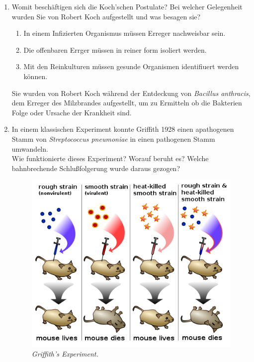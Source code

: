 	\begin{enumerate}
		\item Womit beschäftigen sich die Koch’schen Postulate?
		Bei welcher Gelegenheit wurden Sie von Robert Koch aufgestellt und was besagen sie? \hfill \vspace{4mm}
	
		\begin{enumerate}[label=\arabic*)]
			\item In einem Infizierten Organismus müssen Erreger nachweisbar sein.
			\item Die offenbaren Errger müssen in reiner form isoliert werden.
			\item Mit den Reinkulturen müssen gesunde Organismen identifiuert werden können.
		\end{enumerate}
		Sie wurden von Robert Koch während der Entdeckung von \emph{Bacillus anthracis},
		dem Erreger des Milzbrandes aufgestellt,
		um zu Ermitteln ob die Bakterien Folge oder Ursache der Krankheit sind.	
		

		\item In einem klassischen Experiment konnte Griffith 1928 einen apathogenen Stamm von
		\emph{Streptococcus pneumoniae} in einen pathogenen Stamm umwandeln.\\
		Wie funktionierte dieses Experiment? Worauf beruht es? 
		Welche bahnbrechende Schlußfolgerung wurde daraus gezogen? \hfill \vspace{4mm}
		
		\begin{figure}[ht!]
		\leavevmode
		\begin{center}
		\includegraphics[scale=0.47]{./pictures/griffith_exp_500}
		\end{center}
		\caption{\slshape{Griffith's Experiment.}}
		\label{fig:griffith}
		\end{figure}


\end{enumerate}
